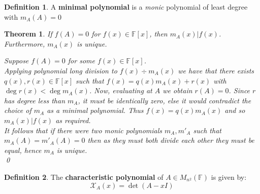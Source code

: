 \documentclass[11pt, a4paper]{report}
\makeatletter
\numberwithin{equation}{section}
\renewcommand{\chi}{\mathcal{X}}
\newcommand{\F}{\mathbb{F}}
\numberwithin{equation}{subsection}
\theoremstyle{plain}
\newtheorem{thm}{Theorem}[chapter] %
\theoremstyle{definition}
\newtheorem{defn}{Definition}[chapter]
\theoremstyle{remark}
\newtheorem*{prf}{Proof}
\renewenvironment{prf}[1][\proofname]{\par
  \vspace{-\topsep}%
  \normalfont
  \topsep0pt \partopsep0pt %
  \trivlist
  \item[\hskip\labelsep
        \itshape
    #1\@addpunct{.}]\ignorespaces
}{%
  \popQED\endtrivlist\@endpefalse
  \addvspace{6pt plus 6pt} %
}
\newcommand{\pr}[1]{\begin{adjustwidth}{1cm}{} \begin{prf} #1 \end{prf} \end{adjustwidth}}
\makeatother
\begin{document}
\newpage
\begin{defn} A \textbf{minimal polynomial} is a \textit{monic} polynomial of least degree with $m_A(A) = 0$ \end{defn}

\begin{thm}
If $f(A) = 0$ for $f(x) \in \F[x]$, then $m_A(x) | f(x)$. Furthermore, $m_A(x)$ is unique.
\pr{
Suppose $f(A) = 0$ for some $f(x) \in \F[x]$.\\ Applying polynomial long division to $f(x) \div m_A(x)$ we have that there exists $q(x), r(x) \in \F[x]$ such that $f(x) = q(x)m_A(x) + r(x)$ with $\deg r(x) < \deg m_A(x)$. Now, evaluating at $A$ we obtain $r(A) = 0$. Since $r$ has degree less than $m_A$, it must be identically zero, else it would contradict the choice of $m_A$ as a minimal polynomial. Thus $f(x) = q(x)m_A(x)$ and so $m_A(x) | f(x)$ as required.\\
It follows that if there were two monic polynomials $m_A, m'_A$ such that $m_A(A) = m'_A(A) = 0$ then as they must both divide each other they must be equal, hence $m_A$ is unique.\\[-8pt]\qed
}
\end{thm}

\begin{defn} The \textbf{characteristic polynomial} of $A \in M_{n^2}(\F)$ is given by:
$$\chi_A(x) = \det(A - xI)$$
\end{defn}
\end{document}
